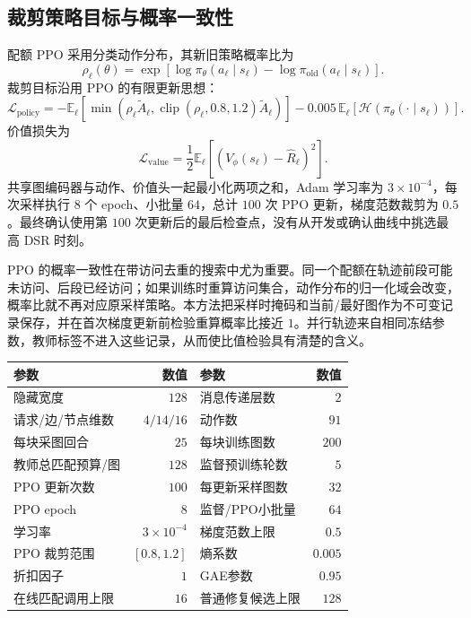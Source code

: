 \subsection{裁剪策略目标与概率一致性}

配额 PPO 采用分类动作分布，其新旧策略概率比为
\begin{equation}
 \rho_\ell(\theta)=
 \exp\left[\log\pi_\theta(a_\ell\mid s_\ell)
          -\log\pi_{\mathrm{old}}(a_\ell\mid s_\ell)\right].
 \label{legacy:eq:ch5-search-ratio}
\end{equation}
裁剪目标沿用 PPO 的有限更新思想\cite{schulman2017proximal}：
\begin{equation}
 \mathcal L_{\mathrm{policy}}=-\mathbb E_\ell\left[
 \min\left(\rho_\ell\widetilde A_\ell,
 \operatorname{clip}(\rho_\ell,0.8,1.2)\widetilde A_\ell\right)\right]
 -0.005\,\mathbb E_\ell[\mathcal H(\pi_\theta(\cdot\mid s_\ell))].
 \label{legacy:eq:ch5-search-ppo}
\end{equation}
价值损失为
\begin{equation}
 \mathcal L_{\mathrm{value}}=
 \frac12\mathbb E_\ell\left[(V_\phi(s_\ell)-\widehat R_\ell)^2\right].
 \label{legacy:eq:ch5-search-value}
\end{equation}
共享图编码器与动作、价值头一起最小化两项之和，Adam 学习率为 $3\times10^{-4}$，每次采样执行 $8$ 个 epoch、小批量 $64$，总计 $100$ 次 PPO 更新，梯度范数裁剪为 $0.5$。最终确认使用第 $100$ 次更新后的最后检查点，没有从开发或确认曲线中挑选最高 DSR 时刻。

PPO 的概率一致性在带访问去重的搜索中尤为重要。同一个配额在轨迹前段可能未访问、后段已经访问；如果训练时重算访问集合，动作分布的归一化域会改变，概率比就不再对应原采样策略。本方法把采样时掩码和当前/最好图作为不可变记录保存，并在首次梯度更新前检验重算概率比接近 $1$。并行轨迹来自相同冻结参数，教师标签不进入这些记录，从而使比值检验具有清楚的含义。

\begin{table}[!htbp]
 \centering
 \label{legacy:tab:ch5-learning-settings}
 \begin{tabular}{lrlr}
  \toprule
  参数 & 数值 & 参数 & 数值 \\
  \midrule
  隐藏宽度 & $128$ & 消息传递层数 & $2$ \\
  请求/边/节点维数 & $4/14/16$ & 动作数 & $91$ \\
  每块采图回合 & $25$ & 每块训练图数 & $200$ \\
  教师总匹配预算/图 & $128$ & 监督预训练轮数 & $5$ \\
  PPO 更新次数 & $100$ & 每更新采样图数 & $32$ \\
  PPO epoch & $8$ & 监督/PPO小批量 & $64$ \\
  学习率 & $3\times10^{-4}$ & 梯度范数上限 & $0.5$ \\
  PPO 裁剪范围 & $[0.8,1.2]$ & 熵系数 & $0.005$ \\
  折扣因子 & $1$ & GAE参数 & $0.95$ \\
  在线匹配调用上限 & $16$ & 普通修复候选上限 & $128$ \\
  \bottomrule
 \end{tabular}
\end{table}

